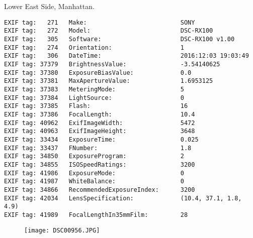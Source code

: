 \section{\protect{}}
\noindent Lower East Side, Manhattan.
\noindent
\begin{lstlisting}
EXIF tag:   271   Make:                          SONY
EXIF tag:   272   Model:                         DSC-RX100
EXIF tag:   305   Software:                      DSC-RX100 v1.00
EXIF tag:   274   Orientation:                   1
EXIF tag:   306   DateTime:                      2016:12:03 19:03:49
EXIF tag: 37379   BrightnessValue:               -3.54140625
EXIF tag: 37380   ExposureBiasValue:             0.0
EXIF tag: 37381   MaxApertureValue:              1.6953125
EXIF tag: 37383   MeteringMode:                  5
EXIF tag: 37384   LightSource:                   0
EXIF tag: 37385   Flash:                         16
EXIF tag: 37386   FocalLength:                   10.4
EXIF tag: 40962   ExifImageWidth:                5472
EXIF tag: 40963   ExifImageHeight:               3648
EXIF tag: 33434   ExposureTime:                  0.025
EXIF tag: 33437   FNumber:                       1.8
EXIF tag: 34850   ExposureProgram:               2
EXIF tag: 34855   ISOSpeedRatings:               3200
EXIF tag: 41986   ExposureMode:                  0
EXIF tag: 41987   WhiteBalance:                  0
EXIF tag: 34866   RecommendedExposureIndex:      3200
EXIF tag: 42034   LensSpecification:             (10.4, 37.1, 1.8, 4.9)
EXIF tag: 41989   FocalLengthIn35mmFilm:         28

\end{lstlisting}
\clearpage
\begin{figure}
\raggedleft
\texttt{[image: DSC00956.JPG]}
\end{figure}


\clearpage
